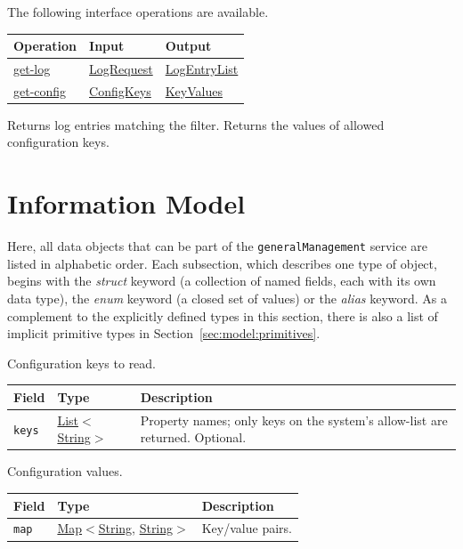 \documentclass[a4paper]{arrowhead}
\newcommand{\mref}[1]{{\textcolor{ArrowheadPurple}{\hyperref[sec:model:#1]{#1}}}}
\newcommand{\oref}[1]{{\textcolor{ArrowheadBlue}{\hyperref[sec:operations:#1]{#1}}}}
\newcommand{\pref}[1]{{\textcolor{ArrowheadGrey}{\hyperref[sec:model:primitives:#1]{#1}}}}
\begin{document}
The following interface operations are available.

{\small
\begin{longtable}{|p{4.4cm}|p{5.6cm}|p{5.8cm}|}

\hline
\rowcolor{gray!33} Operation & Input & Output \\ \hline
\endhead
\oref{get-log} & \mref{LogRequest} & \mref{LogEntryList} \\ \hline
\oref{get-config} & \mref{ConfigKeys} & \mref{KeyValues} \\ \hline
\end{longtable}
}

Returns log entries matching the filter.
Returns the values of allowed configuration keys.

\newpage
\section{Information Model}
\label{sec:model}
Here, all data objects that can be part of the \texttt{general\allowbreak{}Management} service are listed in alphabetic order. Each
subsection, which describes one type of object, begins with the \textit{struct} keyword (a collection of named fields,
each with its own data type), the \textit{enum} keyword (a closed set of values) or the \textit{alias} keyword. As a
complement to the explicitly defined types in this section, there is also a list of implicit primitive types in
Section~\ref{sec:model:primitives}.

Configuration keys to read.

{\small
\begin{longtable}{|p{3.9cm}|p{4.4cm}|p{7.5cm}|}

\hline
\rowcolor{gray!33} Field & Type & Description \\ \hline
\endhead
\texttt{keys} & \pref{List}$<$\pref{String}$>$ & Property names; only keys on the system's allow-list are returned. Optional. \\ \hline
\end{longtable}
}

Configuration values.

{\small
\begin{longtable}{|p{3.9cm}|p{4.4cm}|p{7.5cm}|}

\hline
\rowcolor{gray!33} Field & Type & Description \\ \hline
\endhead
\texttt{map} & \pref{Map}$<$\pref{String}, \pref{String}$>$ & Key/value pairs. \\ \hline
\end{longtable}
}
\end{document}
